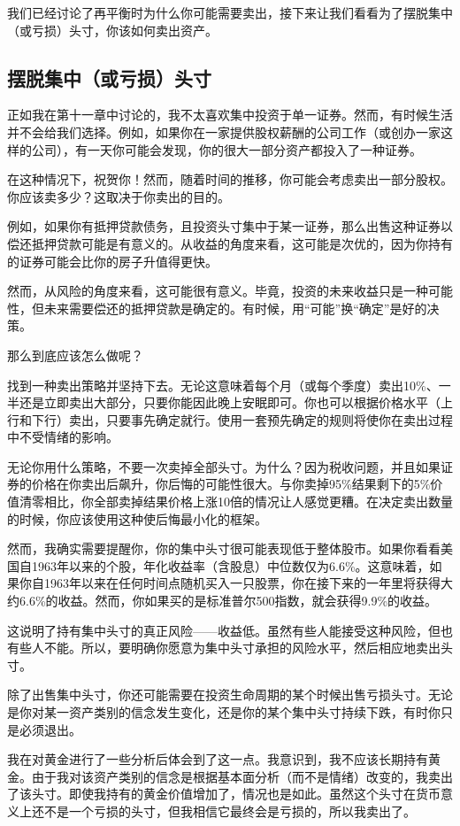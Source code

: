 我们已经讨论了再平衡时为什么你可能需要卖出，接下来让我们看看为了摆脱集中（或亏损）头寸，你该如何卖出资产。

\subsection{摆脱集中（或亏损）头寸}

正如我在第十一章中讨论的，我不太喜欢集中投资于单一证券。然而，有时候生活并不会给我们选择。例如，如果你在一家提供股权薪酬的公司工作（或创办一家这样的公司），有一天你可能会发现，你的很大一部分资产都投入了一种证券。

在这种情况下，祝贺你！然而，随着时间的推移，你可能会考虑卖出一部分股权。你应该卖多少？这取决于你卖出的目的。

例如，如果你有抵押贷款债务，且投资头寸集中于某一证券，那么出售这种证券以偿还抵押贷款可能是有意义的。从收益的角度来看，这可能是次优的，因为你持有的证券可能会比你的房子升值得更快。

然而，从风险的角度来看，这可能很有意义。毕竟，投资的未来收益只是一种可能性，但未来需要偿还的抵押贷款是确定的。有时候，用“可能”换“确定”是好的决策。

那么到底应该怎么做呢？

找到一种卖出策略并坚持下去。无论这意味着每个月（或每个季度）卖出10\%、一半还是立即卖出大部分，只要你能因此晚上安眠即可。你也可以根据价格水平（上行和下行）卖出，只要事先确定就行。使用一套预先确定的规则将使你在卖出过程中不受情绪的影响。

无论你用什么策略，不要一次卖掉全部头寸。为什么？因为税收问题，并且如果证券的价格在你卖出后飙升，你后悔的可能性很大。与你卖掉95\%结果剩下的5\%价值清零相比，你全部卖掉结果价格上涨10倍的情况让人感觉更糟。在决定卖出数量的时候，你应该使用这种使后悔最小化的框架。

然而，我确实需要提醒你，你的集中头寸很可能表现低于整体股市。如果你看看美国自1963年以来的个股，年化收益率（含股息）中位数仅为6.6\%。这意味着，如果你自1963年以来在任何时间点随机买入一只股票，你在接下来的一年里将获得大约6.6\%的收益。然而，你如果买的是标准普尔500指数，就会获得9.9\%的收益。

这说明了持有集中头寸的真正风险——收益低。虽然有些人能接受这种风险，但也有些人不能。所以，要明确你愿意为集中头寸承担的风险水平，然后相应地卖出头寸。

除了出售集中头寸，你还可能需要在投资生命周期的某个时候出售亏损头寸。无论是你对某一资产类别的信念发生变化，还是你的某个集中头寸持续下跌，有时你只是必须退出。

我在对黄金进行了一些分析后体会到了这一点。我意识到，我不应该长期持有黄金。由于我对该资产类别的信念是根据基本面分析（而不是情绪）改变的，我卖出了该头寸。即使我持有的黄金价值增加了，情况也是如此。虽然这个头寸在货币意义上还不是一个亏损的头寸，但我相信它最终会是亏损的，所以我卖出了。

